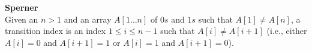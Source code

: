 \textbf{Sperner} \\
Given an $n > 1$ and an array $A[1 \ldots n]$ of $0s$ and $1s$ such that $A[1] \not= A[n]$, 
a transition index is an index $1 \leq i \leq n-1$ such that $A[i] \not= A[i + 1]$ 
(i.e., either $A[i] = 0$ and $A[i + 1] = 1$ or $A[i] = 1$ and $A[i + 1] = 0$).

